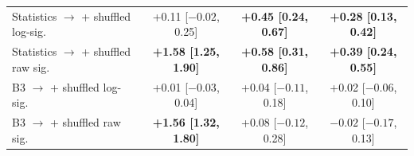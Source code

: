 \begin{tabular}{@{}lccc@{}}
Statistics $\to$ + shuffled log-sig. & +0.11 [$-0.02$, 0.25] & \textbf{\boldmath +0.45 [0.24, 0.67]} & \textbf{\boldmath +0.28 [0.13, 0.42]} \\
Statistics $\to$ + shuffled raw sig. & \textbf{\boldmath +1.58 [1.25, 1.90]} & \textbf{\boldmath +0.58 [0.31, 0.86]} & \textbf{\boldmath +0.39 [0.24, 0.55]} \\
B3 $\to$ + shuffled log-sig. & +0.01 [$-0.03$, 0.04] & +0.04 [$-0.11$, 0.18] & +0.02 [$-0.06$, 0.10] \\
B3 $\to$ + shuffled raw sig. & \textbf{\boldmath +1.56 [1.32, 1.80]} & +0.08 [$-0.12$, 0.28] & $-0.02$ [$-0.17$, 0.13] \\
\bottomrule
\end{tabular}
